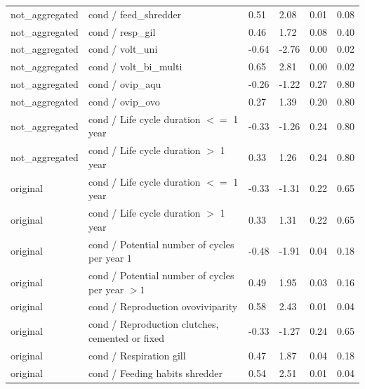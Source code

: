 \documentclass[12pt]{article}
\begin{document}
\begin{longtable}[H]{m{2.6cm}|m{7.3cm}|m{1cm}|m{1.4cm}|m{1.5cm}|m{1.5cm}}
       not\_aggregated & cond / feed\_shredder & 0.51 & 2.08  & 0.01 & 0.08 \\ 
       not\_aggregated & cond / resp\_gil & 0.46 & 1.72  & 0.08 & 0.40 \\ 
       not\_aggregated & cond / volt\_uni & -0.64 & -2.76  & 0.00 & 0.02 \\ 
       not\_aggregated & cond / volt\_bi\_multi & 0.65 & 2.81  & 0.00 & 0.02 \\ 
       not\_aggregated & cond / ovip\_aqu & -0.26 & -1.22  & 0.27 & 0.80 \\ 
       not\_aggregated & cond / ovip\_ovo & 0.27 & 1.39  & 0.20 & 0.80 \\ 
       not\_aggregated & cond / Life cycle duration $<=$ 1 year & -0.33 & -1.26   & 0.24 & 0.80 \\ 
       not\_aggregated & cond / Life cycle duration $>$ 1 year & 0.33 & 1.26  & 0.24 & 0.80 \\ 
       original & cond / Life cycle duration $<=$ 1 year & -0.33 & -1.31  & 0.22 & 0.65 \\ 
       original & cond / Life cycle duration $>$ 1 year & 0.33 & 1.31  & 0.22 & 0.65 \\ 
       original & cond / Potential number of cycles per year $1$ & -0.48 & -1.91  & 0.04 & 0.18 \\ 
       original & cond / Potential number of cycles per year $> 1$  & 0.49 & 1.95  & 0.03 & 0.16 \\ 
       original & cond / Reproduction ovoviviparity & 0.58 & 2.43  & 0.01 & 0.04 \\ 
       original & cond / Reproduction clutches, cemented or fixed & -0.33 & -1.27  & 0.24 & 0.65 \\ 
       original & cond / Respiration gill & 0.47 & 1.87  & 0.04 & 0.18 \\ 
       original & cond / Feeding habits shredder & 0.54 & 2.51  & 0.01 & 0.04 \\ 
      \bottomrule
\end{longtable}
\end{document}
